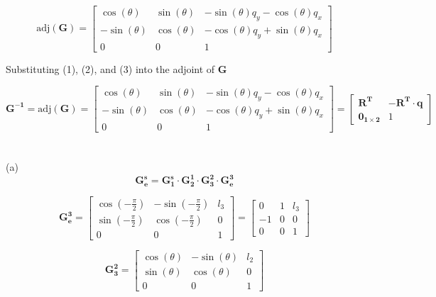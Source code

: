 \documentclass{article}
\begin{document}
\[
\text{adj}(\bm{\mathbf{G}}) = \begin{bmatrix}
\cos(\theta) & \sin(\theta) & -\sin(\theta)q_y - \cos(\theta)q_x \\
-\sin(\theta) & \cos(\theta) & -\cos(\theta)q_y + \sin(\theta)q_x \\
0 & 0 & 1
\end{bmatrix}
\]

Substituting (1), (2), and (3) into the adjoint of \( \bm{\mathbf{G}} \)

\[
\bm{\mathbf{G^{-1}}} = \text{adj}(\bm{\mathbf{G}}) = \begin{bmatrix}
\cos(\theta) & \sin(\theta) & -\sin(\theta)q_y - \cos(\theta)q_x \\
-\sin(\theta) & \cos(\theta) & -\cos(\theta)q_y + \sin(\theta)q_x \\
0 & 0 & 1
\end{bmatrix}
= \begin{bmatrix}\bm{\mathbf{R^T}} & -\bm{\mathbf{R^T}} \cdot \bm{\mathbf{q}} \\
\bm{\mathbf{{0}_{1 \times 2}}} & 1
\end{bmatrix}
\]

\newpage
\section{}
(a)
\[
\bm{\mathbf{G^{s}_{e}}} = \bm{\mathbf{G^{s}_{1}}} \cdot \bm{\mathbf{G^{1}_{2}}} \cdot \bm{\mathbf{G^{2}_{3}}} \cdot \bm{\mathbf{G^{3}_{e}}}
\]

\[
\bm{\mathbf{G_{e}^{3}}} =
\begin{bmatrix}
\cos(-\frac{\pi}{2}) & -\sin(-\frac{\pi}{2}) & l_3 \\
\sin(-\frac{\pi}{2}) & \cos(-\frac{\pi}{2})  & 0 \\
0 & 0 & 1
\end{bmatrix} =
\begin{bmatrix}
0 & 1 & l_3 \\
-1 & 0 & 0 \\
0 & 0 & 1
\end{bmatrix}
\]

\[
\bm{\mathbf{G_{3}^{2}}} =
\begin{bmatrix}
\cos(\theta) & -\sin(\theta) & l_2 \\
\sin(\theta) & \cos(\theta)  & 0 \\
0 & 0 & 1
\end{bmatrix}
\]
\end{document}
